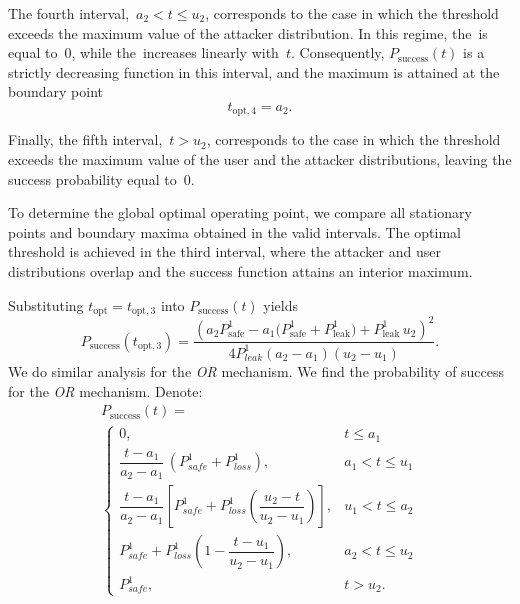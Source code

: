 \documentclass[conference,compsoc]{IEEEtran}
\begin{document}
The fourth interval,~$a_2 < t \le u_2$, corresponds to the case in which the threshold exceeds the maximum value of the attacker distribution. In this regime, the~\FAR is equal to~0, while the~\FRR increases linearly with~$t$. Consequently, $P_{\text{success}}(t)$ is a strictly decreasing function in this interval, and the maximum is attained at the boundary point
\[
t_{\text{opt},4} = a_2 .
\]

Finally, the fifth interval,~$t > u_2$, corresponds to the case in which the threshold exceeds the maximum value of the user and the attacker distributions, leaving the success probability equal to~0.

To determine the global optimal operating point, we compare all stationary points and boundary maxima obtained in the valid intervals. The optimal threshold is achieved in the third interval, where the attacker and user distributions overlap and the success function attains an interior maximum.

Substituting $t_{\text{opt}}=t_{\text{opt},3}$ into $P_{\text{success}}(t)$ yields
\begin{equation*}
P_{\text{success}}(t_{\text{opt},3})=
\frac{
\left(
a_2 P^1_{\text{safe}} - a_1 \big(P^1_{\text{safe}} + P^1_{\text{leak}}\big)
+ P^1_{\text{leak}}\, u_2
\right)^2
}{
4 P^1_{leak} (a_2 - a_1)(u_2 - u_1)
}.
\end{equation*}
We do similar analysis for the \emph{OR} mechanism. We find the probability of success for the \emph{OR} mechanism. Denote: 
\begin{multline*}
P_{\mathrm{success}}(t)=\\
\begin{cases}
0,
& t \le a_1 \\
\dfrac{t - a_1}{a_2 - a_1}\,(P^1_{safe} + P^1_{loss}),
& a_1 < t \le u_1 \\
\dfrac{t - a_1}{a_2 - a_1}\left[P^1_{safe} + P^1_{loss}\left(\dfrac{u_2 - t}{u_2 - u_1}\right)\right],
& u_1 < t \le a_2 \\
P^1_{safe} + P^1_{loss}\left(1 - \dfrac{t - u_1}{u_2 - u_1}\right),
& a_2 < t \le u_2 \\
P^1_{safe},
& t > u_2 .
\end{cases}
\end{multline*}
\end{document}
